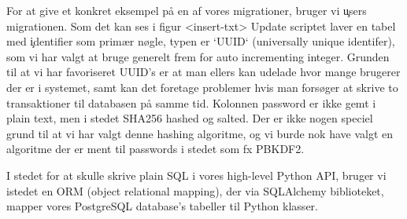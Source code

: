 For at give et konkret eksempel på en af vores migrationer, bruger vi \c{users} migrationen. Som det kan ses i figur <insert-txt>
Update scriptet laver en tabel med \c{identifier} som primær nøgle, typen er `UUID` (universally unique identifer), som vi har valgt at bruge generelt frem for auto incrementing integer. Grunden til at vi har favoriseret UUID's er at man ellers kan udelade hvor mange brugerer der er i systemet, samt kan det foretage problemer hvis man forsøger at skrive to transaktioner til databasen på samme tid. 
Kolonnen password er ikke gemt i plain text, men i stedet SHA256 hashed og salted. Der er ikke nogen speciel grund til at vi har valgt denne hashing algoritme, og vi burde nok have valgt en algoritme der er ment til passwords i stedet som fx PBKDF2.

I stedet for at skulle skrive plain SQL i vores high-level Python API, bruger vi istedet en ORM (object relational mapping), der via SQLAlchemy biblioteket, mapper vores PostgreSQL database's tabeller til Python klasser.
